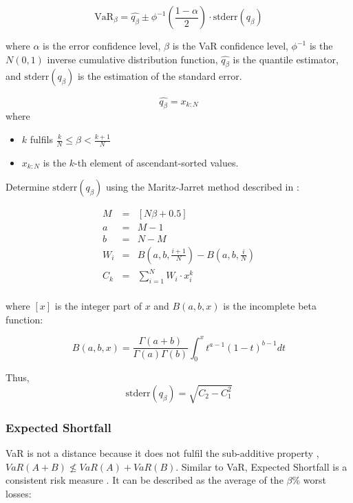 \documentclass[a4paper,12pt,final]{article}
\begin{document}
\begin{displaymath}
\textrm{VaR}_{\beta} = \widehat{q_{\beta}} \pm \phi^{-1}\left(\frac{1-\alpha}{2}\right) \cdot \textrm{stderr}(q_{\beta})
\end{displaymath}

where $\alpha$ is the error confidence level, $\beta$ is the VaR confidence 
level, $\phi^{-1}$ is the $N(0,1)$ inverse cumulative distribution function, 
$\widehat{q_{\beta}}$ is the quantile estimator, and $\textrm{stderr}(q_{\beta})$
is the estimation of the standard error.

\begin{displaymath}
\widehat{q_{\beta}} = x_{k:N}
\end{displaymath}
where
\begin{itemize}
\item $k$ fulfils $\frac{k}{N} \leq \beta < \frac{k+1}{N}$
\item $x_{k:N}$ is the $k$-th element of ascendant-sorted values.
\end{itemize}

Determine $\textrm{stderr}(q_{\beta})$ using the Maritz-Jarret method described
in \cite{quant:algor}:

\begin{displaymath}
\begin{array}{rcl}
M   & = & [N \beta + 0.5]  \\
a   & = & M - 1            \\
b   & = & N - M            \\
W_i & = & B(a,b,\frac{i+1}{N}) - B(a,b,\frac{i}{N}) \\
C_k & = & \sum_{i=1}^{N} W_i \cdot x_i^k \\
\end{array}
\end{displaymath}

where $[x]$ is the integer part of $x$ and $B(a,b,x)$ is the incomplete beta 
function:

\begin{displaymath}
B(a,b,x)=\frac{\Gamma(a+b)}{\Gamma(a)\Gamma(b)}\int_0^x t^{a-1} (1-t)^{b-1} dt
\end{displaymath}

Thus,
\begin{displaymath}
\textrm{stderr}(q_{\beta}) = \sqrt{C_2 - C_1^2}
\end{displaymath}

\subsubsection{Expected Shortfall}
VaR is not a distance because it does not fulfil the sub-additive property 
\cite{var:varbad}, $VaR(A+B) \nleq VaR(A)+VaR(B)$. Similar to VaR, Expected 
Shortfall is a consistent risk measure \cite{var:eshortfall}. It can be described
as the average of the $\beta\%$ worst losses:
\end{document}
